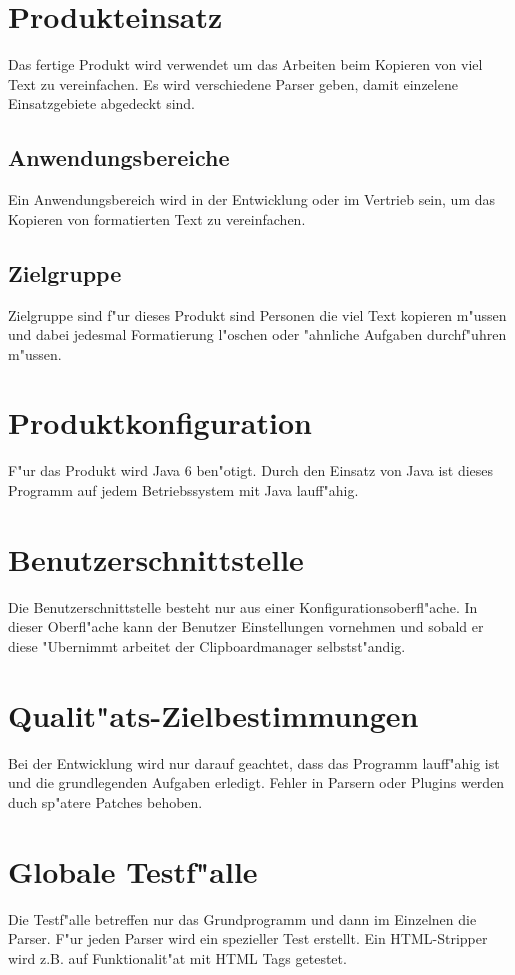 \documentclass[a4paper,11pt,abstracton,titlepage]{scrartcl}
\begin{document}
\section{Produkteinsatz}
Das fertige Produkt wird verwendet um das Arbeiten beim Kopieren von viel Text zu vereinfachen. Es wird verschiedene Parser geben, damit einzelene Einsatzgebiete abgedeckt sind.
\subsection{Anwendungsbereiche}
Ein Anwendungsbereich wird in der Entwicklung oder im Vertrieb sein, um das Kopieren von formatierten Text zu vereinfachen. 
\subsection{Zielgruppe}
Zielgruppe sind f"ur dieses Produkt sind Personen die viel Text kopieren m"ussen und dabei jedesmal Formatierung l"oschen oder "ahnliche Aufgaben durchf"uhren m"ussen.
\section{Produktkonfiguration}
F"ur das Produkt wird Java\footnotesize{\texttrademark} \normalsize 6 ben"otigt. Durch den Einsatz von Java\footnotesize{\texttrademark} \normalsize ist dieses Programm auf jedem Betriebssystem mit Java\footnotesize{\texttrademark} \normalsize lauff"ahig.
\section{Benutzerschnittstelle}
Die Benutzerschnittstelle besteht nur aus einer Konfigurationsoberfl"ache.
In dieser Oberfl"ache kann der Benutzer Einstellungen vornehmen und sobald er diese "Ubernimmt arbeitet der Clipboardmanager selbstst"andig. 
\section{Qualit"ats-Zielbestimmungen}
Bei der Entwicklung wird nur darauf geachtet, dass das Programm lauff"ahig ist und die grundlegenden Aufgaben erledigt. Fehler in Parsern oder Plugins werden duch sp"atere Patches behoben.
\section{Globale Testf"alle}
Die Testf"alle betreffen nur das Grundprogramm und dann im Einzelnen die Parser. F"ur jeden Parser wird ein spezieller Test erstellt. Ein HTML-Stripper wird z.B. auf Funktionalit"at mit HTML Tags getestet.
\end{document}
